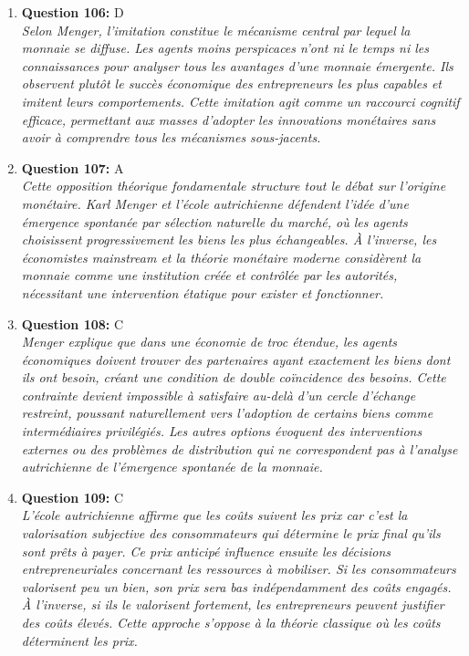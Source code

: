 \documentclass[12pt,a4paper]{article}
\begin{document}
\begin{enumerate}
\item \textbf{Question 106:} D
\\ \textit{Selon Menger, l'imitation constitue le mécanisme central par lequel la monnaie se diffuse. Les agents moins perspicaces n'ont ni le temps ni les connaissances pour analyser tous les avantages d'une monnaie émergente. Ils observent plutôt le succès économique des entrepreneurs les plus capables et imitent leurs comportements. Cette imitation agit comme un raccourci cognitif efficace, permettant aux masses d'adopter les innovations monétaires sans avoir à comprendre tous les mécanismes sous-jacents.}

\item \textbf{Question 107:} A
\\ \textit{Cette opposition théorique fondamentale structure tout le débat sur l'origine monétaire. Karl Menger et l'école autrichienne défendent l'idée d'une émergence spontanée par sélection naturelle du marché, où les agents choisissent progressivement les biens les plus échangeables. À l'inverse, les économistes mainstream et la théorie monétaire moderne considèrent la monnaie comme une institution créée et contrôlée par les autorités, nécessitant une intervention étatique pour exister et fonctionner.}

\item \textbf{Question 108:} C
\\ \textit{Menger explique que dans une économie de troc étendue, les agents économiques doivent trouver des partenaires ayant exactement les biens dont ils ont besoin, créant une condition de double coïncidence des besoins. Cette contrainte devient impossible à satisfaire au-delà d'un cercle d'échange restreint, poussant naturellement vers l'adoption de certains biens comme intermédiaires privilégiés. Les autres options évoquent des interventions externes ou des problèmes de distribution qui ne correspondent pas à l'analyse autrichienne de l'émergence spontanée de la monnaie.}

\item \textbf{Question 109:} C
\\ \textit{L'école autrichienne affirme que les coûts suivent les prix car c'est la valorisation subjective des consommateurs qui détermine le prix final qu'ils sont prêts à payer. Ce prix anticipé influence ensuite les décisions entrepreneuriales concernant les ressources à mobiliser. Si les consommateurs valorisent peu un bien, son prix sera bas indépendamment des coûts engagés. À l'inverse, si ils le valorisent fortement, les entrepreneurs peuvent justifier des coûts élevés. Cette approche s'oppose à la théorie classique où les coûts déterminent les prix.}


\end{enumerate}
\end{document}
